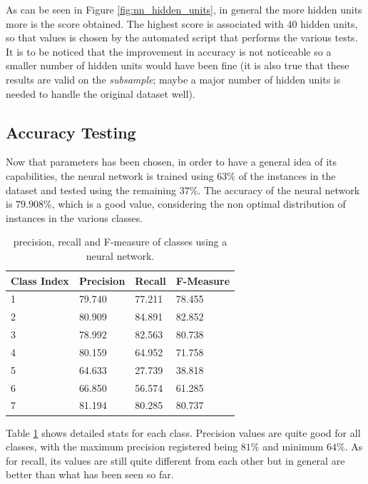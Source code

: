 \documentclass[a4paper, 10pt]{article}
\begin{document}
As can be seen in Figure \ref{fig:nn_hidden_units}, in general the more hidden units more is the score obtained. The highest score is associated with $40$ hidden units, so that values is chosen by the automated script that performs the various tests. It is to be noticed that the improvement in accuracy is not noticeable so a smaller number of hidden units would have been fine (it is also true that these results are valid on the \emph{subsample}; maybe a major number of hidden units is needed to handle the original dataset well).

\subsection{Accuracy Testing}
Now that parameters has been chosen, in order to have a general idea of its capabilities, the neural network is trained using $63\%$ of the instances in the dataset and tested using the remaining $37\%$. The accuracy of the neural network is $79.908\%$, which is a good value, considering the non optimal distribution of instances in the various classes.

\begin{table}[H]
\centering
\begin{tabular}{|l|l|l|l|}
\hline
\textbf{Class Index} & \textbf{Precision} & \textbf{Recall} & \textbf{F-Measure}\\\hline
1 & 79.740 & 77.211& 78.455\\\hline
2 & 80.909 & 84.891& 82.852\\\hline
3 & 78.992 & 82.563& 80.738\\\hline
4 & 80.159 & 64.952& 71.758\\\hline
5 & 64.633 & 27.739& 38.818\\\hline
6 & 66.850 & 56.574& 61.285\\\hline
7 & 81.194 & 80.285& 80.737\\\hline
\end{tabular}
\caption{precision, recall and F-measure of classes using a neural network.}
\label{tab:nn_test_pr}
\end{table}

Table \ref{tab:nn_test_pr} shows detailed stats for each class. Precision values are quite good for all classes, with the maximum precision registered being $81\%$ and minimum $64\%$. As for recall, its values are still quite different from each other but in general are better than what has been seen so far. 
\end{document}
